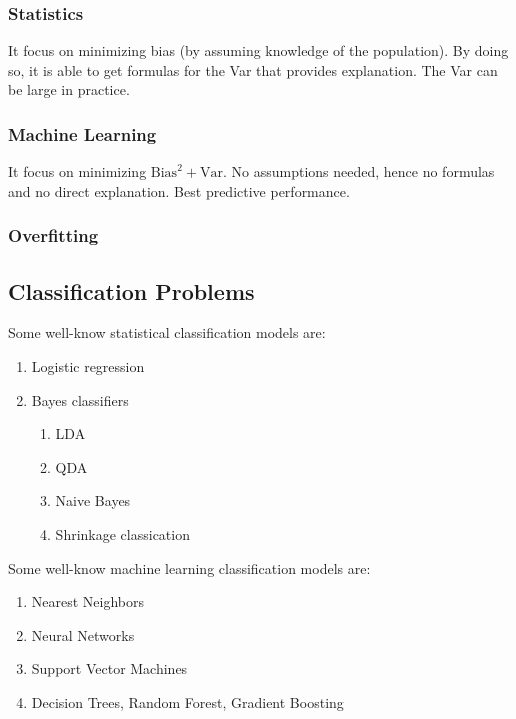 \subsubsection{Statistics}
It focus on minimizing bias (by assuming knowledge of the population). By doing
so, it is able to get formulas for the Var that provides explanation. The Var can be large in practice.

\subsubsection{Machine Learning}
It focus on minimizing $\text{Bias}^2 + \text{Var}$. No assumptions needed,
hence no formulas and no direct explanation. Best predictive performance.


\subsubsection{Overfitting}

\subsection{Classification Problems}

Some well-know statistical classification models are:
\begin{enumerate}
    \item Logistic regression
    \item Bayes classifiers
    \begin{enumerate}
        \item LDA
        \item QDA
        \item Naive Bayes
        \item Shrinkage classication
    \end{enumerate}
\end{enumerate}

Some well-know machine learning classification models are:
\begin{enumerate}
    \item Nearest Neighbors
    \item Neural Networks
    \item Support Vector Machines
    \item Decision Trees, Random Forest, Gradient Boosting
\end{enumerate}

